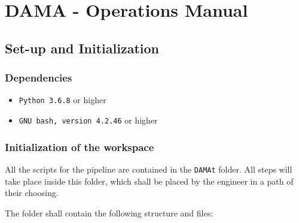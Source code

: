 
\chapter{DAMA - Operations Manual}
\label{chapter:dama:operations}

\section{Set-up and Initialization}
\label{sec:dama_setup}
\subsection{Dependencies}

\begin{itemize}
	\item \texttt{Python 3.6.8} or higher
	\item \texttt{GNU bash, version 4.2.46} or higher
\end{itemize}

\subsection{Initialization of the \DAMA workspace}

All the scripts for the \DAMA pipeline are contained in the \texttt{DAMAt} folder.
All \DAMA steps will take place inside this folder, which shall be placed by the engineer in a path of their choosing.

The folder shall contain the following structure and files:

